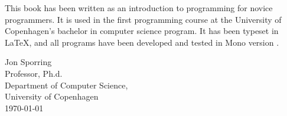 %
%

\preface

This book has been written as an introduction to programming for novice programmers. It is used in the first programming course at the University of Copenhagen's bachelor in computer science program. It has been typeset in \LaTeX, and all programs have been developed and tested in Mono version \monoVersion.


\vspace*{1cm}
Jon Sporring\\
Professor, Ph.d.\\
Department of Computer Science,\\
University of Copenhagen\\
\today\\
